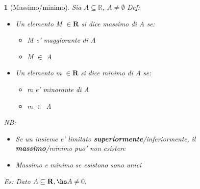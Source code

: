 \documentclass{book}
\theoremstyle{mystyle}
\newtheorem*{mydefinition}{}
\begin{document}
 \begin{mydefinition}[Massimo/minimo]
      Sia $A\subseteq \mathds{R}$, $A\neq \emptyset$ \newline Def: \begin{itemize}
          \item Un elemento M $\in \mathbf{R}$ si dice massimo di A se: \begin{itemize}
              \item M e' maggiorante di A
              \item M $\in$ A
          \end{itemize}
           \item Un elemento m $\in \mathbf{R}$ si dice minimo di A se: \begin{itemize}
              \item m e' minorante di A
              \item m $\in$ A
          \end{itemize}
      \end{itemize}
     \emph{NB}: \begin{itemize}
         \item Se un insieme e' limitato \textbf{superiormente}/\textit{inferiormente}, il \textbf{massimo}/\textit{minimo} puo' non esistere
         \item Massimo e minimo se esistono sono unici
     \end{itemize}
     Es: \newline
     Dato $A \subseteq \mathbf{R}, \hs A\neq 0, $
 \end{mydefinition}
\end{document}
